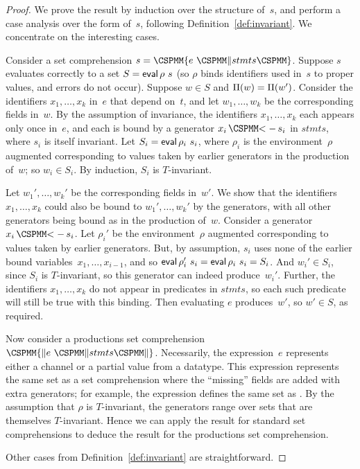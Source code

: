 \begin{proof}
We prove the result by induction over the structure of~$s$, and perform a case
analysis over the form of~$s$, following Definition~\ref{def:invariant}.  We
concentrate on the interesting cases.

Consider a set comprehension $s = \M\{ e ~ \M\| stmts \M\}$.  Suppose $s$
evaluates correctly to a set $S = \mathop{\sf eval} \rho~s$ (so $\rho$ binds identifiers
used in~$s$ to proper values, and errors do not occur).  Suppose $w \in S$ and
$\Pi(w) = \Pi(w')$.  Consider the identifiers $x_1,\ldots,x_k$ in~$e$
that depend on~$t$, and let $w_1,\ldots,w_k$ be the corresponding fields
in~$w$.  By the assumption of invariance, the identifiers $x_1,\ldots,x_k$
each appears only once in~$e$, and each is bound by a generator $x_i
\,\M{<-}\, s_i$ in $stmts$, where $s_i$ is itself invariant.  Let $S_i = \mathop{\sf eval}
\rho_i~s_i$, where $\rho_i$ is the environment~$\rho$ augmented corresponding
to values taken by earlier generators in the production of~$w$; so $w_i \in
S_i$.  By induction, $S_i$ is $T$-invariant.

Let $w_1',\ldots,w_k'$ be the corresponding fields in~$w'$.  We show that the
identifiers $x_1,\ldots,x_k$ could also be bound to $w_1',\ldots,w_k'$ by the
generators, with all other generators being bound as in the production of~$w$.
Consider a generator $x_i \,\M{<-}\, s_i$.  Let $\rho_i'$ be the
environment~$\rho$ augmented corresponding to values taken by earlier
generators.  But, by assumption, $s_i$ uses none of the earlier bound
variables~$x_1,\ldots,x_{i-1}$, and so $\mathop{\sf eval} \rho_i'~s_i = \mathop{\sf eval} \rho_i~s_i =
S_i$.  And $w_i' \in S_i$, since $S_i$ is $T$-invariant, so this generator can
indeed produce~$w_i'$.  Further, the identifiers $x_1,\ldots,x_k$ do not
appear in predicates in $stmts$, so each such predicate will still be true
with this binding.  Then evaluating $e$ produces~$w'$, so $w' \in S$, as
required.

Now consider a productions set comprehension $\M{\{\|} e ~ \M\| stmts \M{\|\}}$.
Necessarily, the expression~$e$ represents either a channel or a partial value
from a datatype.  This expression represents the same set as a set
comprehension where the ``missing'' fields are added with extra generators;
for example, the expression   defines the same set as
.  By the assumption that $\rho$ is
$T$-invariant, the generators range over sets that are themselves
$T$-invariant.  Hence we can apply the result for standard set comprehensions
to deduce the result for the productions set comprehension. 

Other cases from Definition~\ref{def:invariant} are straightforward.
\end{proof}

